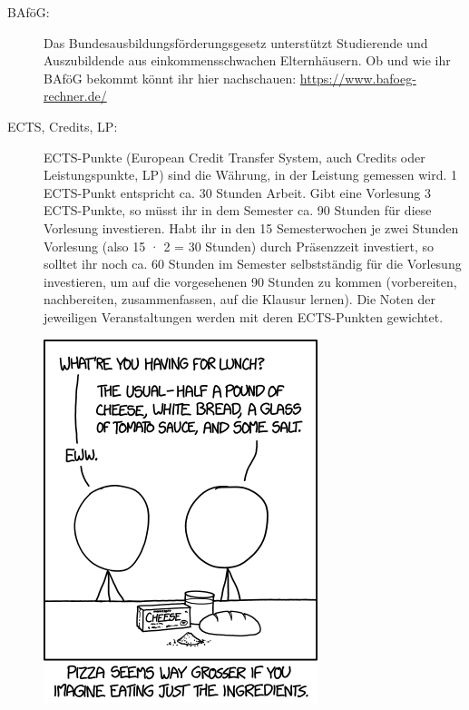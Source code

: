 \begin{description}

\item[BAföG:] Das Bundesausbildungsförderungsgesetz unterstützt Studierende und Auszubildende aus einkommensschwachen Elternhäusern. Ob und wie ihr BAföG bekommt könnt ihr hier nachschauen: \url{https://www.bafoeg-rechner.de/}	%


\item[ECTS, Credits, LP:] ECTS-Punkte (European Credit Transfer System, auch Credits oder
Leistungspunkte, LP) sind die Währung, in der Leistung gemessen wird. 1
ECTS-Punkt entspricht ca. 30 Stunden Arbeit. Gibt eine Vorlesung 3 ECTS-Punkte,
so müsst ihr in dem Semester ca. 90 Stunden für diese Vorlesung investieren. Habt
ihr in den 15 Semesterwochen je zwei Stunden Vorlesung (also 15 · 2 = 30 Stunden) durch Präsenzzeit investiert, so solltet ihr noch ca. 60 Stunden im Semester
selbstständig für die Vorlesung investieren, um auf die vorgesehenen 90 Stunden zu kommen (vorbereiten, nachbereiten, zusammenfassen, auf die Klausur lernen).
Die Noten der jeweiligen Veranstaltungen werden mit deren ECTS-Punkten gewichtet.

\vfill

\begin{center}
\includegraphics[width=0.35\hsize]{shared/xkcd/lunch.png}
\end{center}

\pagebreak

\end{description}
